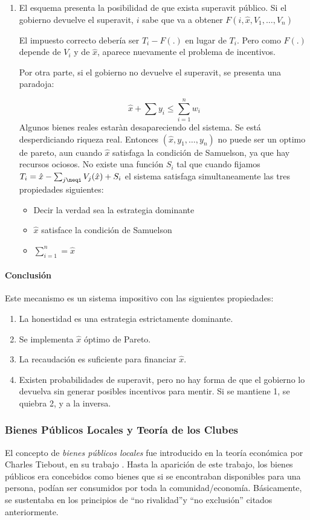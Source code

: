 \begin{enumerate}
\begin{enumerate}
\item El esquema presenta la posibilidad de que exista superavit público.
Si el gobierno devuelve el superavit, $i$ sabe que va a obtener $F(i,\hat{x},V_1,\ldots, V_n)$

El impuesto correcto debería ser $T_i-F(.)$ en lugar de $T_i$.
Pero como $F(.)$ depende de $V_i$ y de $\hat{x}$, aparece nuevamente el problema de incentivos.

Por otra parte, si el gobierno no devuelve el superavit, se presenta una paradoja:

$$\hat{x}+\sum{y_i}\leq\sum_{i=1}^{n}w_i$$
Algunos bienes reales estaràn desapareciendo del sistema.  Se está desperdiciando riqueza real. Entonces $(\hat{x},y_1,\ldots,y_n)$ no puede ser un optimo de pareto, aun cuando $\hat{x}$ satisfaga la condición de Samuelson, ya que hay recursos ociosos.
No existe una función $S_i$ tal que cuando fijamos $T_i=\hat{x}-\sum_{j\neqi}V_j(\hat{x})+S_i$ el sistema satisfaga simultaneamente las tres propiedades siguientes:
\begin{itemize}
\item Decir la verdad sea la estrategia dominante
\item $\hat{x}$ satisface la condición de Samuelson
\item $\sum_{i=1}^{n}=\hat{x}$
\end{itemize}
\end{enumerate}

\paragraph{Conclusión}
Este mecanismo es un sistema impositivo con las siguientes propiedades:
\begin{enumerate}
\item La honestidad es una estrategia estrictamente dominante.
\item Se implementa $\hat{x}$ óptimo de Pareto.
\item La recaudación es suficiente para financiar $\hat{x}$.
\item Existen probabilidades de superavit, pero no hay forma de que el gobierno lo devuelva sin generar posibles incentivos para mentir. Si se mantiene 1, se quiebra 2, y a la inversa.
\end{enumerate}

\subsubsection{Bienes Públicos Locales y Teoría de los Clubes}
El concepto de \emph{bienes públicos locales} fue introducido en la teoría económica por Charles Tiebout, en su trabajo \cite{Tiebout_1956}. Hasta la aparición de este trabajo, los bienes públicos era concebidos como bienes que si se encontraban disponibles para una persona, podían ser consumidos por toda la comunidad/economía. Básicamente, se sustentaba en los principios de ``no rivalidad''y ``no exclusión'' citados anteriormente.


\end{enumerate}
